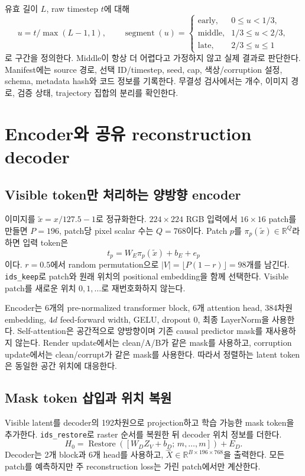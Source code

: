 \documentclass[11pt,a4paper]{article}
\newcommand{\code}[1]{\nolinkurl{#1}}
\newcommand{\R}{\mathbb{R}}
\begin{document}
유효 길이 $L$, raw timestep $t$에 대해
\begin{equation}
u=t/\max(L-1,1),\qquad
\operatorname{segment}(u)=
\begin{cases}
\text{early},&0\le u<1/3,\\
\text{middle},&1/3\le u<2/3,\\
\text{late},&2/3\le u\le1
\end{cases}
\end{equation}
로 구간을 정의한다. Middle이 항상 더 어렵다고 가정하지 않고 실제 결과로 판단한다.
Manifest에는 source 경로, 선택 ID/timestep, seed, cap, 색상/corruption 설정,
schema, metadata hash와 코드 정보를 기록한다. 무결성 검사에서는 개수, 이미지
경로, 검증 상태, trajectory 집합의 분리를 확인한다.

\section{Encoder와 공유 reconstruction decoder}
\subsection{Visible token만 처리하는 양방향 encoder}
이미지를 $\tilde{x}=x/127.5-1$로 정규화한다. $224\times224$ RGB 입력에서
$16\times16$ patch를 만들면 $P=196$, patch당 pixel scalar 수는 $Q=768$이다.
Patch $p$를 $\pi_p(\tilde{x})\in\R^Q$라 하면 입력 token은
\begin{equation}
t_p=W_E\pi_p(\tilde{x})+b_E+e_p
\end{equation}
이다. $r=0.5$에서 random permutation으로
$|V|=\lfloor P(1-r)\rfloor=98$개를 남긴다.
\code{ids_keep}로 patch와 원래 위치의 positional embedding을 함께 선택한다.
Visible patch를 새로운 위치 $0,1,\ldots$로 재번호화하지 않는다.

Encoder는 6개의 pre-normalized transformer block, 6개 attention head,
384차원 embedding, $4d$ feed-forward width, GELU, dropout 0, 최종 LayerNorm을
사용한다. Self-attention은 공간적으로 양방향이며 기존 causal predictor mask를
재사용하지 않는다. Render update에서는 clean/A/B가 같은 mask를 사용하고,
corruption update에서는 clean/corrupt가 같은 mask를 사용한다. 따라서 정렬하는
latent token은 동일한 공간 위치에 대응한다.

\subsection{Mask token 삽입과 위치 복원}
Visible latent를 decoder의 192차원으로 projection하고 학습 가능한 mask token을
추가한다. \code{ids_restore}로 raster 순서를 복원한 뒤 decoder 위치 정보를 더한다.
\begin{equation}
H_0=\operatorname{Restore}\left([W_DZ_V+b_D;\,m,\ldots,m]\right)+E_D.
\end{equation}
Decoder는 2개 block과 6개 head를 사용하고,
$\widehat{X}\in\R^{B\times196\times768}$을 출력한다.
모든 patch를 예측하지만 주 reconstruction loss는 가린 patch에서만 계산한다.
\end{document}
